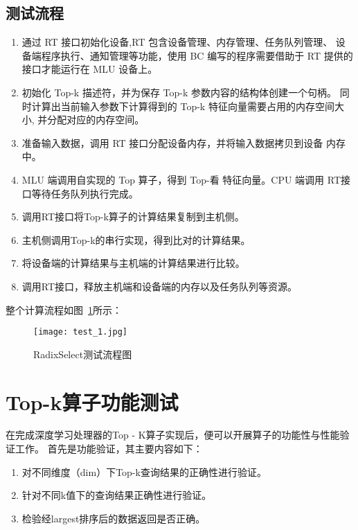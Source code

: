 \subsection{测试流程}
\begin{enumerate}
    \item 通过 RT 接口初始化设备,RT 包含设备管理、内存管理、任务队列管理、 设备端程序执行、通知管理等功能，使用 BC 编写的程序需要借助于 RT 提供的 接口才能运行在 MLU 设备上。
    \item 初始化 Top-k 描述符，并为保存 Top-k 参数内容的结构体创建一个句柄。 同时计算出当前输入参数下计算得到的 Top-k 特征向量需要占用的内存空间大 小, 并分配对应的内存空间。
    \item 准备输入数据，调用 RT 接口分配设备内存，并将输入数据拷贝到设备 内存中。
    \item MLU 端调用自实现的 Top 算子，得到 Top-看 特征向量。CPU 端调用 RT接口等待任务队列执行完成。
    
    \item 调用RT接口将Top-k算子的计算结果复制到主机侧。
    \item 主机侧调用Top-k的串行实现，得到比对的计算结果。
    \item 将设备端的计算结果与主机端的计算结果进行比较。
    \item 调用RT接口，释放主机端和设备端的内存以及任务队列等资源。
    
\end{enumerate}
整个计算流程如图~\ref{fig:test}所示：

\begin{figure}[ht]
    \centering
    \texttt{[image: test\_1.jpg]}
    \caption{RadixSelect测试流程图}
    \label{fig:test}
\end{figure}


\section{Top-k算子功能测试}
在完成深度学习处理器的Top - K算子实现后，便可以开展算子的功能性与性能验证工作。
首先是功能验证，其主要内容如下：
\begin{enumerate}
\item 对不同维度（dim）下Top-k查询结果的正确性进行验证。
\item 针对不同k值下的查询结果正确性进行验证。
\item 检验经largest排序后的数据返回是否正确。
\end{enumerate}

